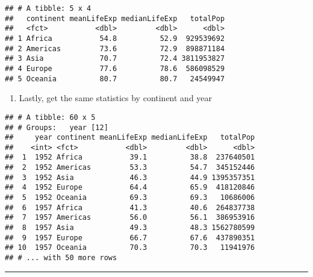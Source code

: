 \documentclass[]{article}
\newenvironment{Shaded}{\begin{snugshade}}{\end{snugshade}}
\newcommand{\KeywordTok}[1]{\textcolor[rgb]{0.13,0.29,0.53}{\textbf{#1}}}
\newcommand{\DataTypeTok}[1]{\textcolor[rgb]{0.13,0.29,0.53}{#1}}
\newcommand{\StringTok}[1]{\textcolor[rgb]{0.31,0.60,0.02}{#1}}
\newcommand{\OperatorTok}[1]{\textcolor[rgb]{0.81,0.36,0.00}{\textbf{#1}}}
\newcommand{\NormalTok}[1]{#1}
\providecommand{\tightlist}{%
  \setlength{\itemsep}{0pt}\setlength{\parskip}{0pt}}
\begin{document}
\begin{verbatim}
## # A tibble: 5 x 4
##   continent meanLifeExp medianLifeExp   totalPop
##   <fct>           <dbl>         <dbl>      <dbl>
## 1 Africa           54.8          52.9  929539692
## 2 Americas         73.6          72.9  898871184
## 3 Asia             70.7          72.4 3811953827
## 4 Europe           77.6          78.6  586098529
## 5 Oceania          80.7          80.7   24549947
\end{verbatim}

\begin{enumerate}
\def\labelenumi{\arabic{enumi}.}
\setcounter{enumi}{9}
\tightlist
\item
  Lastly, get the same statistics by continent and year
\end{enumerate}

\begin{Shaded}
\end{Shaded}

\begin{verbatim}
## # A tibble: 60 x 5
## # Groups:   year [12]
##     year continent meanLifeExp medianLifeExp   totalPop
##    <int> <fct>           <dbl>         <dbl>      <dbl>
##  1  1952 Africa           39.1          38.8  237640501
##  2  1952 Americas         53.3          54.7  345152446
##  3  1952 Asia             46.3          44.9 1395357351
##  4  1952 Europe           64.4          65.9  418120846
##  5  1952 Oceania          69.3          69.3   10686006
##  6  1957 Africa           41.3          40.6  264837738
##  7  1957 Americas         56.0          56.1  386953916
##  8  1957 Asia             49.3          48.3 1562780599
##  9  1957 Europe           66.7          67.6  437890351
## 10  1957 Oceania          70.3          70.3   11941976
## # ... with 50 more rows
\end{verbatim}

\begin{center}\rule{0.5\linewidth}{\linethickness}\end{center}
\end{document}
